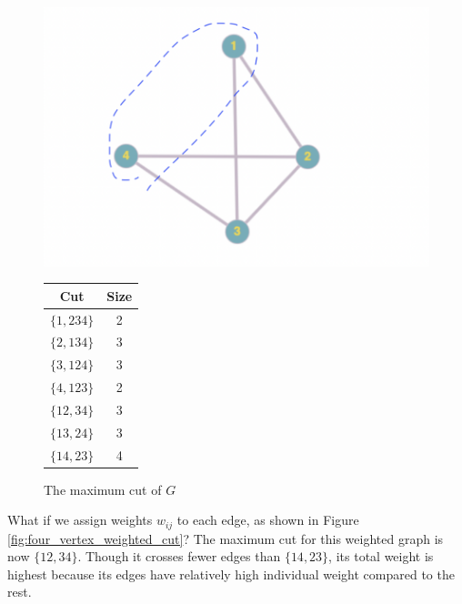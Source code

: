 \begin{figure}[!ht]
    \centering
    \includegraphics[scale=.35]{four_vertex_cut.png}
    \qquad
    \begin{tabular}[b]{|c|c|}
        \hline
        Cut & Size \\
        \hline
        $\{1,234\}$ & 2\\
        $\{2,134\}$ & 3\\
        $\{3,124\}$ & 3\\
        $\{4,123\}$ & 2\\
        $\{12,34\}$ & 3\\
        $\{13,24\}$ & 3\\
        $\{14,23\}$ & 4\\
        \hline
    \end{tabular}
    \captionsetup{labelformat=andtable}
    \caption{The maximum cut of $G$}
    \label{fig:four_vertex_cut}
\end{figure}

\par What if we assign weights $w_{ij}$ to each edge, as shown in Figure \ref{fig:four_vertex_weighted_cut}? The maximum cut for this weighted graph is now $\{12,34\}$. Though it crosses fewer edges than $\{14,23\}$, its total weight is highest because its edges have relatively high individual weight compared to the rest. \\

